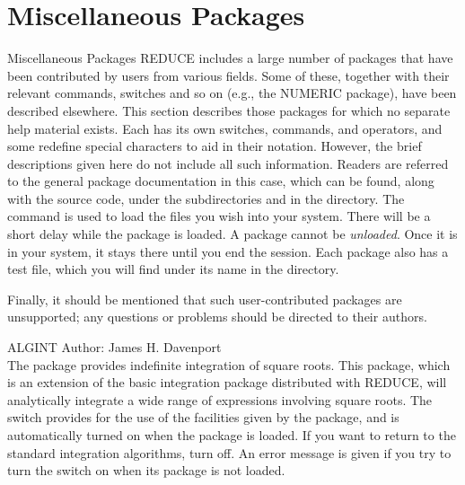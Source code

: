 \section{Miscellaneous Packages}

\begin{Introduction}{Miscellaneous Packages}
REDUCE includes a large number of packages that have been contributed by
users from various fields.  Some of these, together with their relevant
commands, switches and so on (e.g., the NUMERIC package), have
been described elsewhere.  This section describes those packages for which
no separate help material exists.  Each has its own switches, commands,
and operators, and some redefine special characters to aid in their
notation.  However, the brief descriptions given here do not include all
such information.  Readers are referred to the general package
documentation in this case, which can be found, along with the source
code, under the subdirectories  and  in the
 directory.  The  command is used to
load the files you wish into your system.  There will be a short delay
while the package is loaded.  A package cannot be {\it unloaded}.  Once it
is in your system, it stays there until you end the session.  Each package
also has a test file, which you will find under its name in the
 directory.

Finally, it should be mentioned that such user-contributed packages are
unsupported; any questions or problems should be directed to their
authors.

\end{Introduction}

\begin{Package}{ALGINT}
Author: James H. Davenport \\

The  package provides indefinite integration of square roots.
This package, which is an extension of the basic integration package
distributed with REDUCE, will analytically integrate a wide range of
expressions involving square roots.  The  switch provides for
the use of the facilities given by the package, and is automatically turned
on when the package is loaded.  If you want to return to the standard
integration algorithms, turn  off.  An error message is given
if you try to turn the  switch on when its package is not
loaded.
\end{Package}

